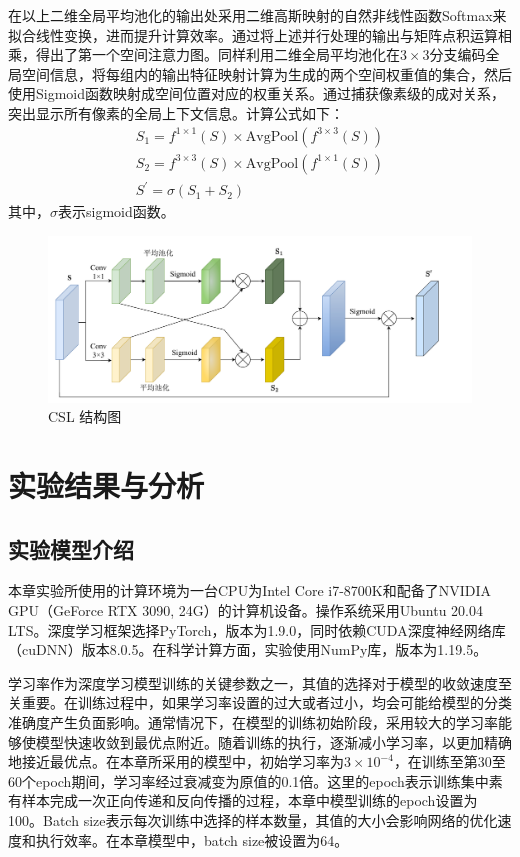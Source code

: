在以上二维全局平均池化的输出处采用二维高斯映射的自然非线性函数Softmax来拟合线性变换，进而提升计算效率。通过将上述并行处理的输出与矩阵点积运算相乘，得出了第一个空间注意力图。同样利用二维全局平均池化在$3\times 3$分支编码全局空间信息，将每组内的输出特征映射计算为生成的两个空间权重值的集合，然后使用Sigmoid函数映射成空间位置对应的权重关系。通过捕获像素级的成对关系，突出显示所有像素的全局上下文信息。计算公式如下：
\begin{gather}
  S_1=f^{1\times 1}\left( S \right) \times \mathrm{AvgPool}\left( f^{3\times 3}\left( S \right) \right)
  \\
  S_2=f^{3\times 3}\left( S \right) \times \mathrm{AvgPool}\left( f^{1\times 1}\left( S \right) \right)
  \\
  S^{\prime}=\sigma \left( S_1+S_2 \right)
\end{gather}
其中，$\sigma$表示sigmoid函数。

\begin{figure}[ht!]
  \centering
  \includegraphics[width=14cm]{pic/chapter3/跨空间学习.pdf}
  \caption{CSL 结构图}
  \label{DPEN_CSL}
\end{figure}


\section{实验结果与分析}
\subsection{实验模型介绍}
本章实验所使用的计算环境为一台CPU为Intel Core i7-8700K和配备了NVIDIA GPU（GeForce RTX 3090, 24G）的计算机设备。操作系统采用Ubuntu 20.04 LTS。深度学习框架选择PyTorch，版本为1.9.0，同时依赖CUDA深度神经网络库（cuDNN）版本8.0.5。在科学计算方面，实验使用NumPy库，版本为1.19.5。

学习率作为深度学习模型训练的关键参数之一，其值的选择对于模型的收敛速度至关重要。在训练过程中，如果学习率设置的过大或者过小，均会可能给模型的分类准确度产生负面影响。通常情况下，在模型的训练初始阶段，采用较大的学习率能够使模型快速收敛到最优点附近。随着训练的执行，逐渐减小学习率，以更加精确地接近最优点。在本章所采用的模型中，初始学习率为$3\times 10^{-4}$，在训练至第30至60个epoch期间，学习率经过衰减变为原值的0.1倍。这里的epoch表示训练集中素有样本完成一次正向传递和反向传播的过程，本章中模型训练的epoch设置为100。Batch size表示每次训练中选择的样本数量，其值的大小会影响网络的优化速度和执行效率。在本章模型中，batch size被设置为64。

